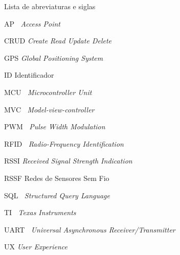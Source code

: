 \documentclass[]{politex}
\begin{document}
\begin{pretextualsection}{Lista de abreviaturas e siglas}

AP \quad \quad $\>$ \textit{Access Point}

CRUD \quad \textit{Create Read Update Delete}

GPS \quad \quad \textit{Global Positioning System}

ID \quad \quad \quad Identificador

MCU \quad $\>$ \textit{Microcontroller Unit}

MVC \quad $\>$ \textit{Model-view-controller}

PWM \quad $\>$ \textit{Pulse Width Modulation}

RFID \quad $\>$ \textit{Radio-Frequency Identification}

RSSI \quad \quad \textit{Received Signal Strength Indication}

RSSF \quad \quad Redes de Sensores Sem Fio

SQL \quad \quad $\>$ \textit{Structured Query Language}

TI \quad \quad \quad $\>$ \textit{Texas Instruments}

UART \quad $\>$ \textit{Universal Asynchronous Receiver/Transmitter}

UX \quad \quad \quad \textit{User Experience}

\end{pretextualsection}

\sumario




















%


\end{document}

